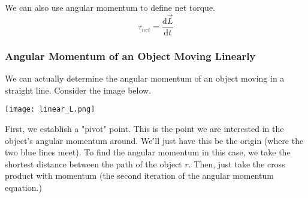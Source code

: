 We can also use angular momentum to define net torque.
\begin{equation}
    \tau_{net} = \frac{\text{d} \vec{L}}{\text{d} t}
\end{equation}

\subsubsection{Angular Momentum of an Object Moving Linearly}
We can actually determine the angular momentum of an object moving in a straight line. Consider the image below.

\texttt{[image: linear\_L.png]}

First, we establish a "pivot" point. This is the point we are interested in the object's angular momentum around. We'll just have this be the
origin (where the two blue lines meet). To find the angular momentum in this case, we take the shortest distance between the path of the object
$r$. Then, just take the cross product with momentum (the second iteration of the angular momentum equation.)